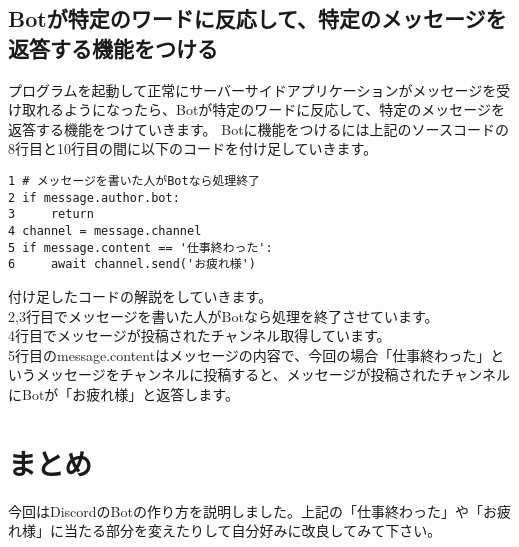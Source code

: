 \subsection{Botが特定のワードに反応して、特定のメッセージを返答する機能をつける}
プログラムを起動して正常にサーバーサイドアプリケーションがメッセージを受け取れるようになったら、Botが特定のワードに反応して、特定のメッセージを返答する機能をつけていきます。
Botに機能をつけるには上記のソースコードの8行目と10行目の間に以下のコードを付け足していきます。\\
\begin{tcolorbox}[breakable]
  \begin{verbatim}
1 # メッセージを書いた人がBotなら処理終了
2 if message.author.bot:
3     return
4 channel = message.channel 
5 if message.content == '仕事終わった':
6     await channel.send('お疲れ様')
\end{verbatim}
\end{tcolorbox}
付け足したコードの解説をしていきます。\\
2,3行目でメッセージを書いた人がBotなら処理を終了させています。\\
4行目でメッセージが投稿されたチャンネル取得しています。\\
5行目のmessage.contentはメッセージの内容で、今回の場合「仕事終わった」というメッセージをチャンネルに投稿すると、メッセージが投稿されたチャンネルにBotが「お疲れ様」と返答します。
\section{まとめ}
今回はDiscordのBotの作り方を説明しました。上記の「仕事終わった」や「お疲れ様」に当たる部分を変えたりして自分好みに改良してみて下さい。